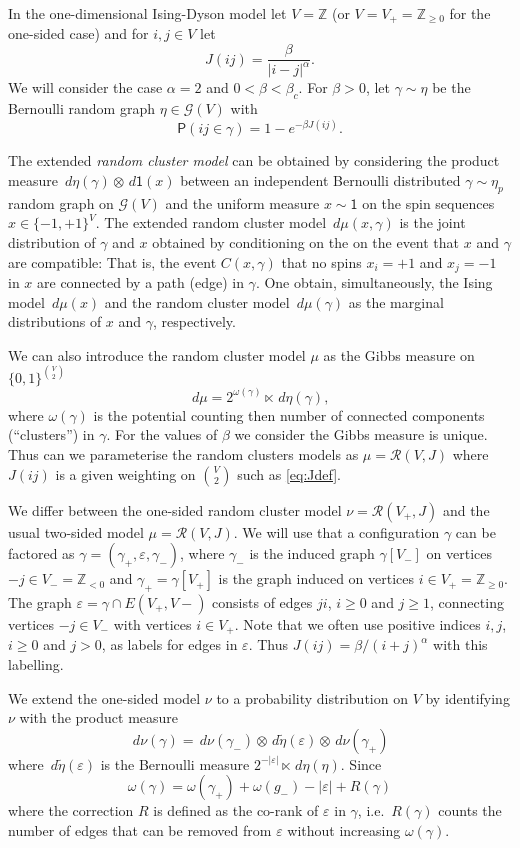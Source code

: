 \documentclass[11pt, a4paper, oneside]{article}
\theoremstyle{definition}
\theoremstyle{remark}
\renewcommand{\d}{\,d}
\providecommand{\ZZ}{\mathbb{Z}}
\providecommand{\mscr}{\mathscr}
\renewcommand{\P}{\mathsf{P}}
\providecommand{\ett}{\mathsf{1}}
\providecommand{\e}{\epsilon}
\providecommand{\tl}{\tilde}
\providecommand{\g}{\gamma}
\providecommand{\w}{\omega}
\def\e{\varepsilon}
\begin{document}
In the one-dimensional Ising-Dyson model let $V=\ZZ$ (or $V=V_+=\ZZ_{\ge0}$ for
the one-sided case) and for $i,j\in V$ let
\begin{equation}\label{eq:Jdef}
  J({ij}) = \frac \beta{|i-j|^\alpha}.
\end{equation}
We will consider the case $\alpha=2$ and $0<\beta <\beta_c$. For $\beta>0$, let
\(\g\sim \eta \) be the Bernoulli random graph $\eta \in \mscr G(V)$ with
$$
\P(ij \in \g)=1-e^{-\beta J({ij})}.
$$

The extended \emph{random cluster model} can be obtained by considering the
product measure $\d\eta(\g) \otimes \d\ett(x)$ between an independent
Bernoulli distributed $\g\sim\eta_p$ random graph on $\mscr G(V)$ and the
uniform measure $x\sim\ett$ on the spin sequences $x\in\{-1,+1\}^{V}$. The
extended random cluster model $\d\mu(x,\g)$ is the joint distribution of $\g$
and $x$ obtained by conditioning on the on the event that $x$ and $\g$ are
compatible: That is, the event $C(x,\g)$ that no spins $x_i=+1$ and $x_j=-1$ in
$x$ are connected by a path (edge) in $\g$. One obtain, simultaneously, the
Ising model $\d\mu(x)$ and the random cluster model $\d\mu(\g)$ as the marginal
distributions of $x$ and $\g$, respectively.

We can also introduce the random cluster model $\mu$ as the Gibbs measure on
$\{0,1\}^{\binom V2}$
$$ \d\mu = 2^{\w(\g)} \ltimes \d\eta(\g), $$
where $\w(\g)$ is the potential counting then number of connected components
(``clusters'') in $\g$. For the values of $\beta$ we consider the Gibbs measure
is unique. Thus can we parameterise the random clusters models as
$\mu = \mscr R(V,J)$ where $J(ij)$ is a given weighting on $\binom V2$ such as
\eqref{eq:Jdef}.

We differ between the one-sided random cluster model $\nu = \mscr R(V_+,J)$ and
the usual two-sided model $\mu = \mscr R(V,J)$. We will use that a configuration
$\g$ can be factored as $\g = (\g_+, \e, \g_-)$, where $\g_-$ is the induced
graph $\g[V_-]$ on vertices $-j\in V_-=\ZZ_{<0}$ and $\g_+=\g[V_+]$ is the graph
induced on vertices $i\in V_+=\ZZ_{\ge0}$. The graph $\e=\g\cap E(V_+,V-)$
consists of edges $ji$, $i\ge0$ and $j\ge 1$, connecting vertices $-j\in V_-$
with vertices $i\in V_+$. Note that we often use positive indices $i,j$, $i\ge0$
and $j>0$, as labels for edges in $\e$. Thus $J(ij)=\beta/(i+j)^\alpha$ with
this labelling.

We extend the one-sided model $\nu$ to a probability distribution on $V$ by
identifying $\nu$ with the product measure
$$
\d\nu(\g) = \d\nu(\gamma_-) \otimes \d\tl\eta(\e) \otimes \d\nu(\g_+)
$$
where $\d\tl\eta(\e)$ is the Bernoulli measure $2^{-|\e|}\ltimes \d\eta(\eta)$.
Since
$$
\w(\g) = \w(\g_+) + \w(g_-) - |\e| + R(\g)
$$
where the correction $R$ is defined as the co-rank of $\e$ in $\g$, i.e.\
$R(\g)$ counts the number of edges that can be removed from $\e$ without
increasing $\w(\g)$.
\end{document}
